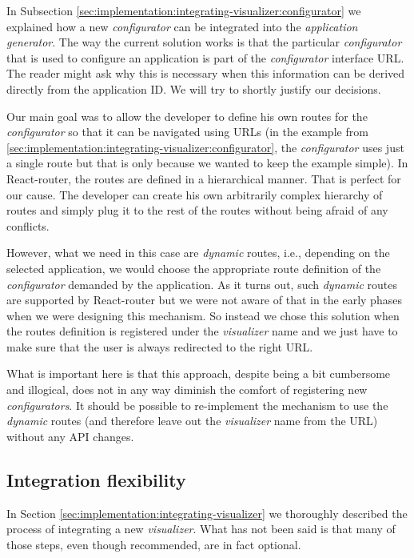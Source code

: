 In Subsection \ref{sec:implementation:integrating-visualizer:configurator} we explained how a new \emph{configurator} can be integrated into the \emph{application generator}. The way the current solution works is that the particular \emph{configurator} that is used to configure an application is part of the \emph{configurator} interface URL. The reader might ask why this is necessary when this information can be derived directly from the application ID. We will try to shortly justify our decisions.

Our main goal was to allow the developer to define his own routes for the \emph{configurator} so that it can be navigated using URLs  (in the example from \ref{sec:implementation:integrating-visualizer:configurator}, the \emph{configurator} uses just a single route but that is only because we wanted to keep the example simple). In  React-router, the routes are defined in a hierarchical manner. That is perfect for our cause. The developer can create his own arbitrarily complex hierarchy of routes and simply plug it to the rest of the routes without being afraid of any conflicts.

However, what we need in this case are \emph{dynamic} routes, i.e., depending on the selected application, we would choose the appropriate route definition of the \emph{configurator} demanded by the application. As it turns out, such \emph{dynamic} routes are supported by React-router but we were not aware of that in the early phases when we were designing this mechanism. So instead we chose this solution when the routes definition is registered under the \emph{visualizer} name and we just have to make sure that the user is always redirected to the right URL.

What is important here is that this approach, despite being a bit cumbersome and illogical, does not in any way diminish the comfort of registering new \emph{configurators}. It should be possible to re-implement the mechanism to use the \emph{dynamic} routes (and therefore leave out the \emph{visualizer} name from the URL) without any API changes.

\subsection{Integration flexibility}

In Section \ref{sec:implementation:integrating-visualizer} we thoroughly described the process of integrating a new \emph{visualizer}. What has not been said is that many of those steps, even though recommended, are in fact optional.

